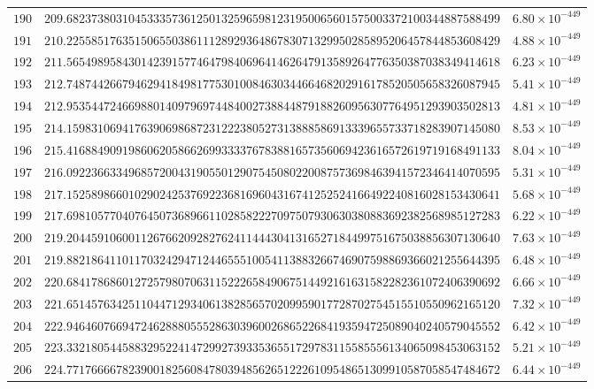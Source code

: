 \documentclass[12pt,reqno]{amsart}
\theoremstyle{remark}
\begin{document}
\begin{longtable}{clc}
$190$ & $209.6823738031045333573612501325965981231950065601575003372100344887588499$ & $6.80\times 10^{-449}$ \\
$191$ & $210.2255851763515065503861112892936486783071329950285895206457844853608429$ & $4.88\times 10^{-449}$ \\
$192$ & $211.5654989584301423915774647984069641462647913589264776350387038349414618$ & $6.23\times 10^{-449}$ \\
$193$ & $212.7487442667946294184981775301008463034466468202916178520505658326087945$ & $5.41\times 10^{-449}$ \\
$194$ & $212.9535447246698801409796974484002738844879188260956307764951293903502813$ & $4.81\times 10^{-449}$ \\
$195$ & $214.1598310694176390698687231222380527313888586913339655733718283907145080$ & $8.53\times 10^{-449}$ \\
$196$ & $215.4168849091986062058662699333376783881657356069423616572619719168491133$ & $8.04\times 10^{-449}$ \\
$197$ & $216.0922366334968572004319055012907545080220087573698463941572346414070595$ & $5.31\times 10^{-449}$ \\
$198$ & $217.1525898660102902425376922368169604316741252524166492240816028153430641$ & $5.68\times 10^{-449}$ \\
$199$ & $217.6981057704076450736896611028582227097507930630380883692382568985127283$ & $6.22\times 10^{-449}$ \\
$200$ & $219.2044591060011267662092827624114443041316527184499751675038856307130640$ & $7.63\times 10^{-449}$ \\
$201$ & $219.8821864110117032429471244655510054113883266746907598869366021255644395$ & $6.48\times 10^{-449}$ \\
$202$ & $220.6841786860127257980706311522265849067514492161631582282361072406390692$ & $6.66\times 10^{-449}$ \\
$203$ & $221.6514576342511044712934061382856570209959017728702754515510550962165120$ & $7.32\times 10^{-449}$ \\
$204$ & $222.9464607669472462888055528630396002686522684193594725089040240579045552$ & $6.42\times 10^{-449}$ \\
$205$ & $223.3321805445883295224147299273933536551729783115585556134065098453063152$ & $5.21\times 10^{-449}$ \\
$206$ & $224.7717666678239001825608478039485626512226109548651309910587058547484672$ & $6.44\times 10^{-449}$ \\

\end{longtable}
\end{document}
